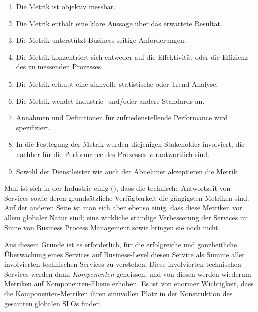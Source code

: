 \documentclass[11pt,listof=totoc]{scrreprt} %
\theoremstyle{definition}
\begin{document}
\begin{enumerate}
\item Die Metrik ist objektiv messbar.
\item Die Metrik enthält eine klare Aussage über das erwartete Resultat.
\item Die Metrik unterstützt Business-seitige Anforderungen.
\item Die Metrik konzentriert sich entweder auf die Effektivität oder die Effizienz des zu messenden Prozesses.
\item Die Metrik erlaubt eine sinnvolle statistische oder Trend-Analyse.
\item Die Metrik wendet Industrie- und/oder andere Standards an.
\item Annahmen und Definitionen für zufriedenstellende Performance wird spezifiziert.
\item In die Festlegung der Metrik wurden diejenigen Stakeholder involviert, die nachher für die Performance des Prozesses verantwortlich sind.
\item Sowohl der Dienstleister wie auch der Abnehmer akzeptieren die Metrik.
\end{enumerate}

Man ist sich in der Industrie einig (\cite{forrester:slaBestPractices, EllisKauferstein200311}), dass die technische Antwortzeit von Services sowie deren grundsätzliche Verfügbarkeit die gängigsten Metriken sind. Auf der anderen Seite ist man sich aber ebenso einig, dass diese Metriken vor allem globaler Natur sind; eine wirkliche ständige Verbesserung der Services im Sinne von Business Process Management sowie \cite{EllisKauferstein200311} bringen sie noch nicht.

Aus diesem Grunde ist es erforderlich, für die erfolgreiche und ganzheitliche Überwachung eines Services auf Business-Level diesen Service als Summe aller involvierten technischen Services zu verstehen. Diese involvierten technischen Services werden dann {\em Komponenten} geheissen, und von diesen werden wiederum Metriken auf Komponenten-Ebene erhoben. Es ist von enormer Wichtigkeit, dass die Komponenten-Metriken ihren sinnvollen Platz in der Konstruktion des gesamten globalen SLOs finden.
\end{document}
